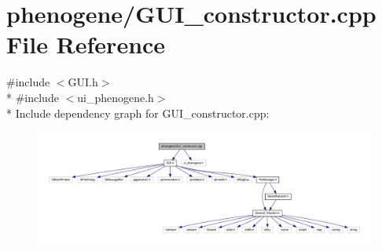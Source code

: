 \hypertarget{a00011}{\section{phenogene/\-G\-U\-I\-\_\-constructor.cpp File Reference}
\label{da/d45/a00011}
}
{\ttfamily \#include $<$G\-U\-I.\-h$>$}\\*
{\ttfamily \#include $<$ui\-\_\-phenogene.\-h$>$}\\*
Include dependency graph for G\-U\-I\-\_\-constructor.\-cpp\-:\nopagebreak
\begin{figure}[H]
\begin{center}
\leavevmode
\includegraphics[width=350pt]{dc/d87/a00032}
\end{center}
\end{figure}
